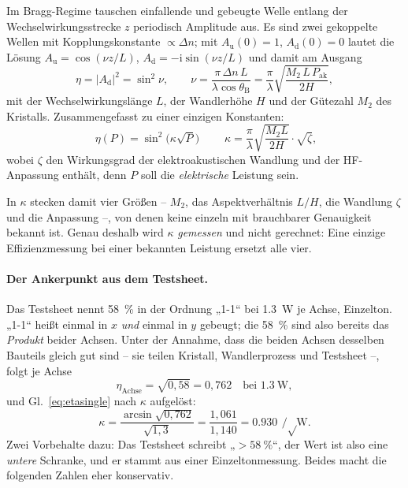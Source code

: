\documentclass[11pt,a4paper]{article}
\begin{document}
Im Bragg-Regime tauschen einfallende und gebeugte Welle entlang der
Wechselwirkungsstrecke $z$ periodisch Amplitude aus. Es sind zwei gekoppelte
Wellen mit Kopplungskonstante $\propto\Delta n$; mit $A_\mathrm{u}(0)=1$, $A_\mathrm{d}(0)=0$
lautet die Lösung $A_\mathrm{u}=\cos(\nu z/L)$, $A_\mathrm{d}=-\mathrm{i}\sin(\nu z/L)$ und
damit am Ausgang
\begin{equation}
  \eta = |A_\mathrm{d}|^2 = \sin^2\nu , \qquad
  \nu = \frac{\pi\,\Delta n\,L}{\lambda\cos\theta_\mathrm{B}}
      = \frac{\pi}{\lambda}\sqrt{\frac{M_2\,L\,P_\mathrm{ak}}{2H}} ,
\end{equation}
mit der Wechselwirkungslänge $L$, der Wandlerhöhe $H$ und der Gütezahl $M_2$
des Kristalls. Zusammengefasst zu einer einzigen Konstanten:
\begin{equation}
  \boxed{\;\eta(P) = \sin^2\!\bigl(\kappa\sqrt{P}\bigr)\;}
  \qquad
  \kappa = \frac{\pi}{\lambda}\sqrt{\frac{M_2 L}{2H}}\cdot\sqrt{\zeta} ,
  \label{eq:etasingle}
\end{equation}
wobei $\zeta$ den Wirkungsgrad der elektroakustischen Wandlung und der
HF-Anpassung enthält, denn $P$ soll die \emph{elektrische} Leistung sein.

\medskip
\noindent In $\kappa$ stecken damit vier Größen -- $M_2$, das
Aspektverhältnis $L/H$, die Wandlung $\zeta$ und die Anpassung --, von denen
keine einzeln mit brauchbarer Genauigkeit bekannt ist. Genau deshalb wird
$\kappa$ \emph{gemessen} und nicht gerechnet: Eine einzige Effizienzmessung
bei einer bekannten Leistung ersetzt alle vier.

\paragraph{Der Ankerpunkt aus dem Testsheet.}
Das Testsheet nennt \SI{58}{\percent} in der Ordnung „1-1`` bei
\SI{1.3}{\watt} je Achse, Einzelton. „1-1`` heißt einmal in $x$ \emph{und}
einmal in $y$ gebeugt; die \SI{58}{\percent} sind also bereits das
\emph{Produkt} beider Achsen. Unter der Annahme, dass die beiden Achsen
desselben Bauteils gleich gut sind -- sie teilen Kristall, Wandlerprozess und
Testsheet --, folgt je Achse
\begin{equation}
  \eta_\mathrm{Achse} = \sqrt{0{,}58} = 0{,}762 \quad\text{bei } \SI{1.3}{\watt},
\end{equation}
und Gl.~\eqref{eq:etasingle} nach $\kappa$ aufgelöst:
\begin{equation}
  \kappa = \frac{\arcsin\sqrt{0{,}762}}{\sqrt{1{,}3}}
         = \frac{1{,}061}{1{,}140} = \SI{0.930}{\per\sqrt\watt}.
  \label{eq:kappa}
\end{equation}
Zwei Vorbehalte dazu: Das Testsheet schreibt „$>\SI{58}{\percent}$``, der
Wert ist also eine \emph{untere} Schranke, und er stammt aus einer
Einzeltonmessung. Beides macht die folgenden Zahlen eher konservativ.
\end{document}
